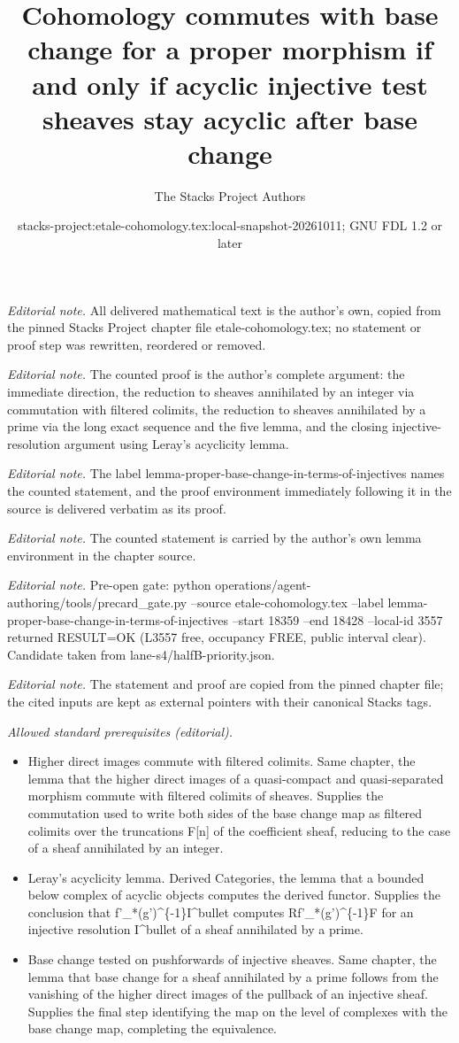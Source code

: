 \documentclass[10pt,a4paper]{amsart}
\title{Cohomology commutes with base change for a proper morphism if and only if acyclic injective test sheaves stay acyclic after base change}
\author{The Stacks Project Authors}
\date{stacks-project:etale-cohomology.tex:local-snapshot-20261011; GNU FDL 1.2 or later}
\theoremstyle{plain}
\theoremstyle{definition}
\theoremstyle{remark}
\numberwithin{equation}{subsection}
\begin{document}
\maketitle
\noindent\textit{Editorial note.} All delivered mathematical text is the author's own, copied from the pinned Stacks Project chapter file etale-cohomology.tex; no statement or proof step was rewritten, reordered or removed.\par\medskip
\noindent\textit{Editorial note.} The counted proof is the author's complete argument: the immediate direction, the reduction to sheaves annihilated by an integer via commutation with filtered colimits, the reduction to sheaves annihilated by a prime via the long exact sequence and the five lemma, and the closing injective-resolution argument using Leray's acyclicity lemma.\par\medskip
\noindent\textit{Editorial note.} The label lemma-proper-base-change-in-terms-of-injectives names the counted statement, and the proof environment immediately following it in the source is delivered verbatim as its proof.\par\medskip
\noindent\textit{Editorial note.} The counted statement is carried by the author's own lemma environment in the chapter source.\par\medskip
\noindent\textit{Editorial note.} Pre-open gate: python operations/agent-authoring/tools/precard\_gate.py --source etale-cohomology.tex --label lemma-proper-base-change-in-terms-of-injectives --start 18359 --end 18428 --local-id 3557 returned RESULT=OK (L3557 free, occupancy FREE, public interval clear). Candidate taken from lane-s4/halfB-priority.json.\par\medskip
\noindent\textit{Editorial note.} The statement and proof are copied from the pinned chapter file; the cited inputs are kept as external pointers with their canonical Stacks tags.\par\medskip
\noindent\textit{Allowed standard prerequisites (editorial).}\begin{itemize}
\item Higher direct images commute with filtered colimits. Same chapter, the lemma that the higher direct images of a quasi-compact and quasi-separated morphism commute with filtered colimits of sheaves. Supplies the commutation used to write both sides of the base change map as filtered colimits over the truncations F[n] of the coefficient sheaf, reducing to the case of a sheaf annihilated by an integer.
\item Leray's acyclicity lemma. Derived Categories, the lemma that a bounded below complex of acyclic objects computes the derived functor. Supplies the conclusion that f'\_*(g')\textasciicircum{}\{-1\}I\textasciicircum{}bullet computes Rf'\_*(g')\textasciicircum{}\{-1\}F for an injective resolution I\textasciicircum{}bullet of a sheaf annihilated by a prime.
\item Base change tested on pushforwards of injective sheaves. Same chapter, the lemma that base change for a sheaf annihilated by a prime follows from the vanishing of the higher direct images of the pullback of an injective sheaf. Supplies the final step identifying the map on the level of complexes with the base change map, completing the equivalence.
\end{itemize}\medskip
\end{document}
